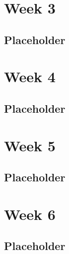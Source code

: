 \documentclass[11pt]{article}
\begin{document}
\newpage
\section{Week 3}

\subsection{Placeholder}


\newpage
\section{Week 4}

\subsection{Placeholder}


\newpage
\section{Week 5}

\subsection{Placeholder}


\newpage
\section{Week 6}

\subsection{Placeholder}
\end{document}
